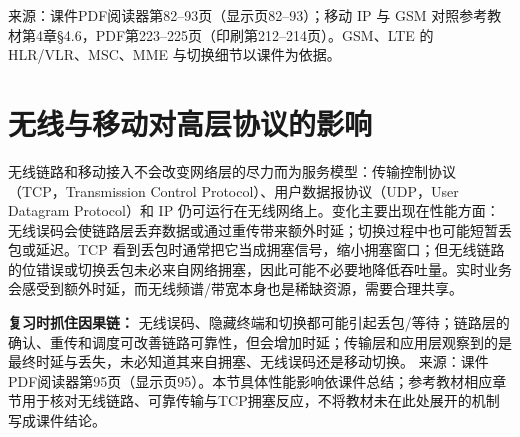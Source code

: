 \annotationarea[4]
\small 来源：课件PDF阅读器第82--93页（显示页82--93）；移动 IP 与 GSM 对照参考教材第4章§4.6，PDF第223--225页（印刷第212--214页）。GSM、LTE 的 HLR/VLR、MSC、MME 与切换细节以课件为依据。\normalsize

\section{无线与移动对高层协议的影响}
无线链路和移动接入不会改变网络层的尽力而为服务模型：传输控制协议（TCP，Transmission Control Protocol）、用户数据报协议（UDP，User Datagram Protocol）和 IP 仍可运行在无线网络上。变化主要出现在性能方面：无线误码会使链路层丢弃数据或通过重传带来额外时延；切换过程中也可能短暂丢包或延迟。TCP 看到丢包时通常把它当成拥塞信号，缩小拥塞窗口；但无线链路的位错误或切换丢包未必来自网络拥塞，因此可能不必要地降低吞吐量。实时业务会感受到额外时延，而无线频谱/带宽本身也是稀缺资源，需要合理共享。

\textbf{复习时抓住因果链：} 无线误码、隐藏终端和切换都可能引起丢包/等待；链路层的确认、重传和调度可改善链路可靠性，但会增加时延；传输层和应用层观察到的是最终时延与丢失，未必知道其来自拥塞、无线误码还是移动切换。
\annotationarea[4]
\small 来源：课件PDF阅读器第95页（显示页95）。本节具体性能影响依课件总结；参考教材相应章节用于核对无线链路、可靠传输与TCP拥塞反应，不将教材未在此处展开的机制写成课件结论。\normalsize

